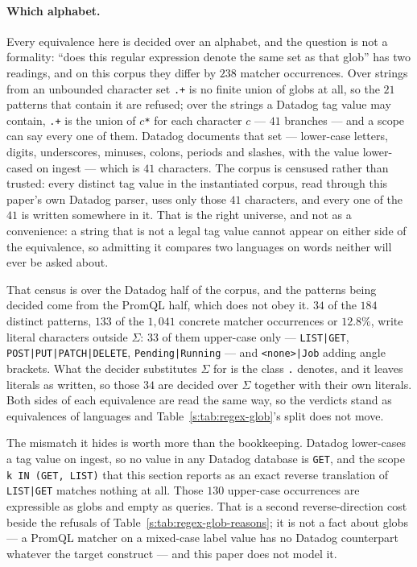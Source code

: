 \paragraph{Which alphabet.}
Every equivalence here is decided over an alphabet, and the question is not a formality:
``does this regular expression denote the same set as that glob'' has two readings, and on
this corpus they differ by $238$ matcher occurrences. Over strings from an unbounded
character set \texttt{.+} is no finite union of globs at all, so the $21$ patterns that
contain it are refused; over the strings a Datadog tag value may contain, \texttt{.+} is
the union of $c$\texttt{*} for each character $c$ --- $41$ branches --- and a scope can say
every one of them. Datadog documents that set --- lower-case letters, digits, underscores,
minuses, colons, periods and slashes, with the value lower-cased on ingest --- which is
$41$ characters. The corpus is censused rather than trusted: every distinct tag value in
the instantiated corpus, read through this paper's own Datadog parser, uses only those
$41$ characters, and every one of the $41$ is written somewhere in it. That is the right
universe, and not as a convenience: a string that is not a legal tag value cannot appear
on either side of the equivalence, so admitting it compares two languages on words neither
will ever be asked about.

That census is over the Datadog half of the corpus, and the patterns being decided come
from the PromQL half, which does not obey it. $34$ of the $184$ distinct patterns, $133$
of the $1{,}041$ concrete matcher occurrences or $12.8\%$, write literal characters
outside $\Sigma$: $33$ of them upper-case only --- \texttt{LIST|GET},
\texttt{POST|PUT|PATCH|DELETE}, \texttt{Pending|Running} --- and \texttt{<none>|Job}
adding angle brackets. What the decider substitutes $\Sigma$ for is the class \texttt{.}
denotes, and it leaves literals as written, so those $34$ are decided over $\Sigma$
together with their own literals. Both sides of each equivalence are read the same way, so
the verdicts stand as equivalences of languages and Table~\ref{s:tab:regex-glob}'s split
does not move.

The mismatch it hides is worth more than the bookkeeping. Datadog lower-cases a tag value
on ingest, so no value in any Datadog database is \texttt{GET}, and the scope
\texttt{k IN (GET, LIST)} that this section reports as an exact reverse translation of
\texttt{LIST|GET} matches nothing at all. Those $130$ upper-case occurrences are
expressible as globs and empty as queries. That is a second reverse-direction cost beside
the refusals of Table~\ref{s:tab:regex-glob-reasons}; it is not a fact about globs --- a
PromQL matcher on a mixed-case label value has no Datadog counterpart whatever the target
construct --- and this paper does not model it.

